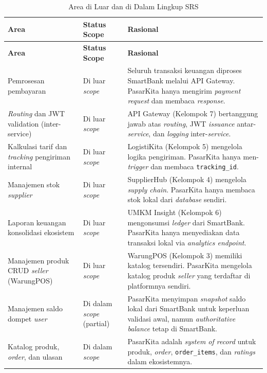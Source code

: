 \begin{longtable}{|L{3.5cm}|L{3cm}|L{8.5cm}|}
    \caption{Area di Luar dan di Dalam Lingkup SRS}
    \label{tab:scope} \\
    \hline
    \textbf{Area} & \textbf{Status Scope} & \textbf{Rasional} \\
    \hline
    \endfirsthead
    \hline
    \textbf{Area} & \textbf{Status Scope} & \textbf{Rasional} \\
    \hline
    \endhead
    \hline
    \endfoot
    Pemrosesan pembayaran
        & Di luar \textit{scope}
        & Seluruh transaksi keuangan diproses SmartBank melalui API Gateway.
          PasarKita hanya mengirim \textit{payment request} dan membaca \textit{response}. \\
    \hline
    \textit{Routing} dan JWT validation (inter-service)
        & Di luar \textit{scope}
        & API Gateway (Kelompok 7) bertanggung jawab atas \textit{routing}, JWT
          \textit{issuance} antar-\textit{service}, dan \textit{logging}
          inter-\textit{service}. \\
    \hline
    Kalkulasi tarif dan \textit{tracking} pengiriman internal
        & Di luar \textit{scope}
        & LogistiKita (Kelompok 5) mengelola logika pengiriman. PasarKita hanya
          men-\textit{trigger} dan membaca \texttt{tracking\_id}. \\
    \hline
    Manajemen stok \textit{supplier}
        & Di luar \textit{scope}
        & SupplierHub (Kelompok 4) mengelola \textit{supply chain}. PasarKita
          hanya membaca stok lokal dari \textit{database} sendiri. \\
    \hline
    Laporan keuangan konsolidasi ekosistem
        & Di luar \textit{scope}
        & UMKM Insight (Kelompok 6) mengonsumsi \textit{ledger} dari SmartBank.
          PasarKita hanya menyediakan data transaksi lokal via \textit{analytics endpoint}. \\
    \hline
    Manajemen produk CRUD \textit{seller} (WarungPOS)
        & Di luar \textit{scope}
        & WarungPOS (Kelompok 3) memiliki katalog tersendiri. PasarKita mengelola
          katalog produk \textit{seller} yang terdaftar di platformnya sendiri. \\
    \hline
    Manajemen saldo dompet \textit{user}
        & Di dalam \textit{scope} (partial)
        & PasarKita menyimpan \textit{snapshot} saldo lokal dari SmartBank untuk
          keperluan validasi awal, namun \textit{authoritative balance} tetap di SmartBank. \\
    \hline
    Katalog produk, \textit{order}, dan ulasan
        & Di dalam \textit{scope}
        & PasarKita adalah \textit{system of record} untuk produk, \textit{order},
          \texttt{order\_items}, dan \textit{ratings} dalam ekosistemnya. \\
    \hline
\end{longtable}
